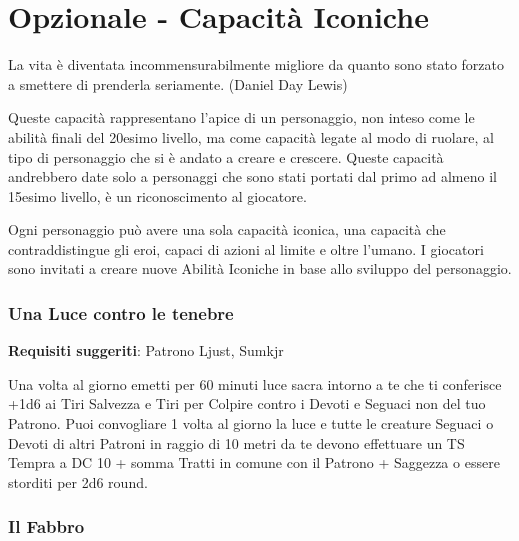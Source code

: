 \section{Opzionale - Capacità Iconiche}\hypertarget{abilitaiconiche}{}\label{abilitaiconiche}

\begin{changemargin}{0.3cm}{0.3cm}\begin{enfasi}{
La vita è diventata incommensurabilmente migliore da quanto sono stato forzato a smettere di prenderla seriamente. (Daniel Day Lewis)
}\end{enfasi}\end{changemargin}\medskip

\begin{multicols}{2}


Queste capacità rappresentano l'apice di un personaggio, non inteso come le abilità finali del 20esimo livello, ma come capacità legate al modo di ruolare, al tipo di personaggio che si è andato a creare e crescere. Queste capacità andrebbero date solo a personaggi che sono stati portati dal primo ad almeno il 15esimo livello, è un riconoscimento al giocatore.

Ogni personaggio può avere una sola capacità iconica, una capacità che contraddistingue gli eroi, capaci di azioni al limite e oltre l'umano. I giocatori sono invitati a creare nuove Abilità Iconiche in base allo sviluppo del personaggio.

\medskip

\subsubsection{Una Luce contro le tenebre}

\textbf{Requisiti suggeriti}: Patrono Ljust, Sumkjr

Una volta al giorno emetti per 60 minuti luce sacra intorno a te che ti conferisce +1d6 ai Tiri Salvezza e Tiri per Colpire contro i Devoti e Seguaci non del tuo Patrono. Puoi convogliare 1 volta al giorno la luce e tutte le creature Seguaci o Devoti di altri Patroni in raggio di 10 metri da te devono effettuare un TS Tempra a DC 10 + somma Tratti in comune con il Patrono + Saggezza o essere storditi per 2d6 round.

\subsubsection{Il Fabbro}


\end{multicols}
